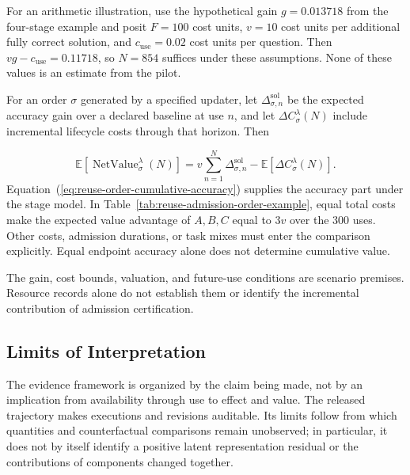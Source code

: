 \documentclass[10pt]{article} %
\renewcommand{\eqref}[1]{\textup{(\ref{#1})}}
\providecommand{\1}{\mathbf{1}}  %
\theoremstyle{remark}
\theoremstyle{definition}
\begin{document}
For an arithmetic illustration, use the hypothetical gain
$g=0.013718$ from the four-stage example and posit $F=100$ cost units,
$v=10$ cost units per additional fully correct solution, and
$c_{\mathrm{use}}=0.02$ cost units per question. Then
$vg-c_{\mathrm{use}}=0.11718$, so $N=854$ suffices under these
assumptions. None of these values is an estimate from the pilot.

For an order $\sigma$ generated by a specified updater, let
$\Delta_{\sigma,n}^{\mathrm{sol}}$ be the expected accuracy gain over a
declared baseline at use $n$, and let $\Delta C_\sigma^\lambda(N)$
include incremental lifecycle costs through that horizon. Then

\begin{equation}
\mathbb E[\operatorname{NetValue}_\sigma^\lambda(N)]
=v\sum_{n=1}^{N}\Delta_{\sigma,n}^{\mathrm{sol}}
-\mathbb E[\Delta C_\sigma^\lambda(N)].
\label{eq:order-cumulative-net-value}
\end{equation}
Equation~\eqref{eq:reuse-order-cumulative-accuracy} supplies the accuracy
part under the stage model. In Table~\ref{tab:reuse-admission-order-example},
equal total costs make the expected value advantage of $A,B,C$ equal to
$3v$ over the 300 uses. Other costs, admission durations, or task mixes
must enter the comparison explicitly. Equal endpoint accuracy alone
does not determine cumulative value.

The gain, cost bounds, valuation, and future-use conditions are scenario
premises. Resource records alone do not establish them or identify the
incremental contribution of admission certification.

\subsection{Limits of Interpretation}
\label{subsec:identification-pilot}

The evidence framework is organized by the claim being made, not by an
implication from availability through use to effect and value. The released
trajectory makes executions and revisions auditable. Its limits follow
from which quantities and counterfactual comparisons remain unobserved;
in particular, it does not by itself identify a positive latent
representation residual or the contributions of components changed together.
\end{document}
